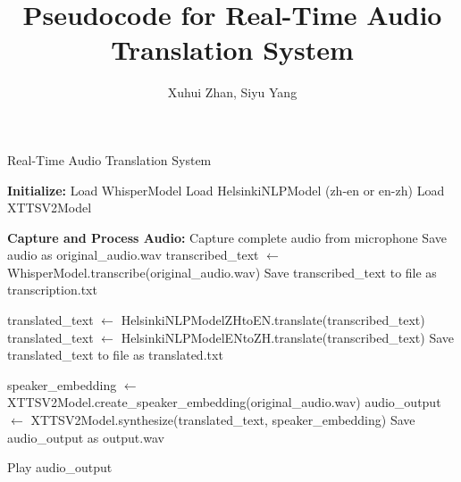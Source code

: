 \documentclass{article}
\title{Pseudocode for Real-Time Audio Translation System}
\author{Xuhui Zhan, Siyu Yang}
\begin{document}
\maketitle

\begin{algorithm}
\caption{Real-Time Audio Translation System}
\begin{algorithmic}[1]
\State \textbf{Initialize:}
\State Load WhisperModel  
\State Load HelsinkiNLPModel (zh-en or en-zh) 
\State Load XTTSV2Model 

\State \textbf{Capture and Process Audio:}
\State Capture complete audio from microphone 
\State Save audio as original\_audio.wav 
\State transcribed\_text $\gets$ WhisperModel.transcribe(original\_audio.wav) 
\State Save transcribed\_text to file as transcription.txt

  \State translated\_text $\gets$ HelsinkiNLPModelZHtoEN.translate(transcribed\_text) 
  \State translated\_text $\gets$ HelsinkiNLPModelENtoZH.translate(transcribed\_text) 
\EndIf
\State Save translated\_text to file as translated.txt 

\State speaker\_embedding $\gets$ XTTSV2Model.create\_speaker\_embedding(original\_audio.wav) 
\State audio\_output $\gets$ XTTSV2Model.synthesize(translated\_text, speaker\_embedding) 
\State Save audio\_output as output.wav 

\State Play audio\_output 
\end{algorithmic}
\end{algorithm}
\end{document}
